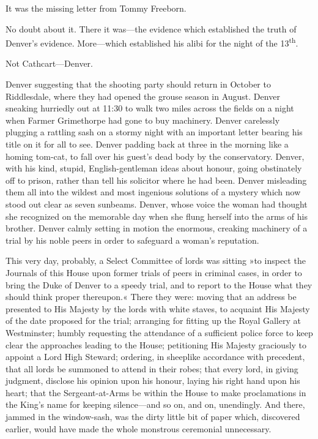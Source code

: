 It was the missing letter from Tommy Freeborn.

No doubt about it. There it was—the evidence which established the truth of Denver's evidence. More—which established his alibi for the night of the 13\textsuperscript{th}.

Not Cathcart—Denver.

Denver suggesting that the shooting party should return in October to Riddlesdale, where they had opened the grouse season in August.  Denver sneaking hurriedly out at 11:30 to walk two miles across the fields on a night when Farmer Grimethorpe had gone to buy machinery.  Denver carelessly plugging a rattling sash on a stormy night with an important letter bearing his title on it for all to see. Denver padding back at three in the morning like a homing tom-cat, to fall over his guest's dead body by the conservatory. Denver, with his kind, stupid, English-gentleman ideas about honour, going obstinately off to prison, rather than tell his solicitor where he had been. Denver misleading them all into the wildest and most ingenious solutions of a mystery which now stood out clear as seven sunbeams. Denver, whose voice the woman had thought she recognized on the memorable day when she flung herself into the arms of his brother. Denver calmly setting in motion the enormous, creaking machinery of a trial by his noble peers in order to safeguard a woman's reputation.

This very day, probably, a Select Committee of lords was sitting »to inspect the Journals of this House upon former trials of peers in criminal cases, in order to bring the Duke of Denver to a speedy trial, and to report to the House what they should think proper thereupon.« There they were: moving that an address be presented to His Majesty by the lords with white staves, to acquaint His Majesty of the date proposed for the trial; arranging for fitting up the Royal Gallery at Westminster; humbly requesting the attendance of a sufficient police force to keep clear the approaches leading to the House; petitioning His Majesty graciously to appoint a Lord High Steward; ordering, in sheeplike accordance with precedent, that all lords be summoned to attend in their robes; that every lord, in giving judgment, disclose his opinion upon his honour, laying his right hand upon his heart; that the Sergeant-at-Arms be within the House to make proclamations in the King's name for keeping silence—and so on, and on, unendingly.  And there, jammed in the window-sash, was the dirty little bit of paper which, discovered earlier, would have made the whole monstrous ceremonial unnecessary.


